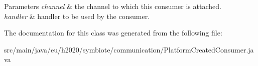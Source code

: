 \begin{DoxyParams}{Parameters}
{\em channel} & the channel to which this consumer is attached. \\
\hline
{\em handler} & handler to be used by the consumer. \\
\hline
\end{DoxyParams}


The documentation for this class was generated from the following file\+:\begin{DoxyCompactItemize}
\item 
src/main/java/eu/h2020/symbiote/communication/Platform\+Created\+Consumer.\+java\end{DoxyCompactItemize}
